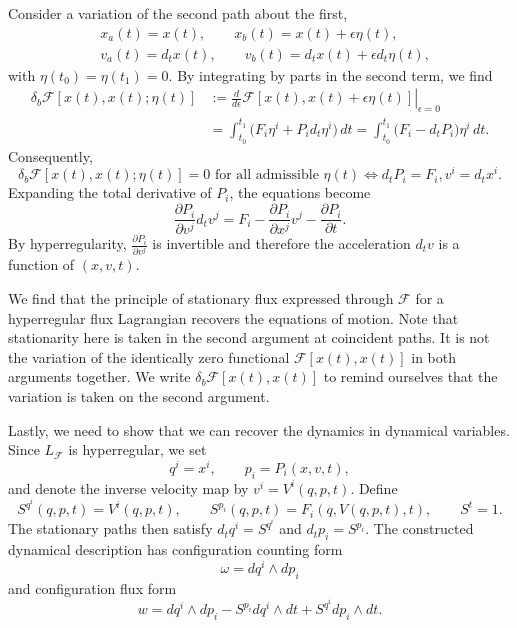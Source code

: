 \documentclass[nofootinbib,aps,pre]{revtex4-2}
\begin{document}
Consider a variation of the second path about the first,
\begin{equation}
	\begin{aligned}
	&x_a(t)=x(t),
	\qquad
	x_b(t)=x(t)+\epsilon\eta(t), \\
	&v_a(t)=d_tx(t),
	\qquad
	v_b(t)=d_tx(t)+\epsilon d_t\eta(t),
	\end{aligned}
\end{equation}
with $\eta(t_0)=\eta(t_1)=0$. By integrating by parts in the second term, we find
\begin{equation}
	\begin{aligned}
		\delta_b\mathcal{F}[x(t),x(t);\eta(t)]
		&:=
		\left.
		\frac{d}{d\epsilon}
		\mathcal{F}[x(t),x(t)+\epsilon\eta(t)]
		\right|_{\epsilon=0}\\
		&=
		\int_{t_0}^{t_1}
		\bigl(F_i\eta^i+P_i d_t\eta^i\bigr)\,dt
		=
		\int_{t_0}^{t_1}
		\bigl(F_i-d_tP_i\bigr)\eta^i\,dt.
	\end{aligned}
\end{equation}
Consequently,
\begin{equation}\label{eq:fluxLagrangianStationarity}
	\delta_b\mathcal{F}[x(t),x(t);\eta(t)]=0
	\text{ for all admissible }\eta(t)
	\iff
	d_tP_i=F_i,
	 v^i=d_tx^i.
\end{equation}
Expanding the total derivative of $P_i$, the equations become
\begin{equation}
	\frac{\partial P_i}{\partial v^j}d_tv^j
	=
	F_i
	-
	\frac{\partial P_i}{\partial x^j}v^j
	-
	\frac{\partial P_i}{\partial t}.
\end{equation}
By hyperregularity, $\frac{\partial P_i}{\partial v^j}$ is invertible and therefore the acceleration $d_t v$ is a function of $(x,v,t)$.

We find that the principle of stationary flux expressed through $\mathcal{F}$ for a hyperregular flux Lagrangian recovers the equations of motion. Note that stationarity here is taken in the second argument at coincident paths. It is not the variation of the identically zero functional $\mathcal{F}[x(t),x(t)]$ in both arguments together. We write $\delta_b \mathcal{F}[x(t),x(t)]$ to remind ourselves that the variation is taken on the second argument.

Lastly, we need to show that we can recover the dynamics in dynamical variables. Since $L_{\mathcal{F}}$ is hyperregular, we set
\begin{equation}
	q^i=x^i,
	\qquad
	p_i=P_i(x,v,t),
\end{equation}
and denote the inverse velocity map by $v^i=V^i(q,p,t)$. Define
\begin{equation}
	S^{q^i}(q,p,t)=V^i(q,p,t),
	\qquad
	S^{p_i}(q,p,t)=F_i(q,V(q,p,t),t),
	\qquad
	S^t=1.
\end{equation}
The stationary paths then satisfy $d_tq^i=S^{q^i}$ and $d_tp_i=S^{p_i}$. The constructed dynamical description has configuration counting form
\begin{equation}
	\omega=dq^i\wedge dp_i
\end{equation}
and configuration flux form
\begin{equation}
	w
	=
	dq^i\wedge dp_i
	-S^{p_i}dq^i\wedge dt
	+S^{q^i}dp_i\wedge dt.
\end{equation}
\end{document}
